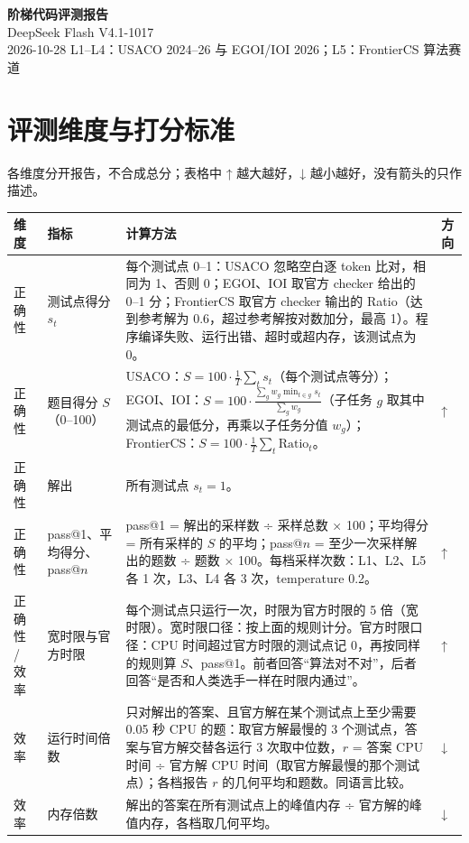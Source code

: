 \documentclass[11pt,a4paper,fontset=none]{ctexart}
\begin{document}
\begin{center}
{\LARGE\bfseries 阶梯代码评测报告}\\[0.5em]
{\Large DeepSeek Flash V4.1-1017}\\[0.4em]
{\small 2026-10-28 \quad L1--L4：USACO 2024--26 与 EGOI/IOI 2026；L5：FrontierCS 算法赛道}
\end{center}
\section{评测维度与打分标准}
各维度分开报告，不合成总分；表格中 ↑ 越大越好，↓ 越小越好，没有箭头的只作描述。
{\small\begin{longtable}{@{}p{1.6cm}p{2.6cm}p{9.9cm}p{1.2cm}@{}}
\toprule 维度 & 指标 & 计算方法 & 方向 \\ \midrule \endhead
正确性 & 测试点得分 $s_t$ & 每个测试点 0–1：USACO 忽略空白逐 token 比对，相同为 1、否则 0；EGOI、IOI 取官方 checker 给出的 0–1 分；FrontierCS 取官方 checker 输出的 Ratio（达到参考解为 0.6，超过参考解按对数加分，最高 1）。程序编译失败、运行出错、超时或超内存，该测试点为 0。 &  \\
正确性 & 题目得分 $S$（0–100） & USACO：$S = 100 \cdot \frac{1}{T}\sum_t s_t$（每个测试点等分）；EGOI、IOI：$S = 100 \cdot \frac{\sum_g w_g \min_{t \in g} s_t}{\sum_g w_g}$（子任务 $g$ 取其中测试点的最低分，再乘以子任务分值 $w_g$）；FrontierCS：$S = 100 \cdot \frac{1}{T}\sum_t \mathrm{Ratio}_t$。 & ↑ \\
正确性 & 解出 & 所有测试点 $s_t = 1$。 &  \\
正确性 & pass@1、平均得分、pass@$n$ & pass@1 = 解出的采样数 ÷ 采样总数 × 100；平均得分 = 所有采样的 $S$ 的平均；pass@$n$ = 至少一次采样解出的题数 ÷ 题数 × 100。每档采样次数：L1、L2、L5 各 1 次，L3、L4 各 3 次，temperature 0.2。 & ↑ \\
正确性 / 效率 & 宽时限与官方时限 & 每个测试点只运行一次，时限为官方时限的 5 倍（宽时限）。宽时限口径：按上面的规则计分。官方时限口径：CPU 时间超过官方时限的测试点记 0，再按同样的规则算 $S$、pass@1。前者回答“算法对不对”，后者回答“是否和人类选手一样在时限内通过”。 & ↑ \\
效率 & 运行时间倍数 & 只对解出的答案、且官方解在某个测试点上至少需要 0.05 秒 CPU 的题：取官方解最慢的 3 个测试点，答案与官方解交替各运行 3 次取中位数，$r$ = 答案 CPU 时间 ÷ 官方解 CPU 时间（取官方解最慢的那个测试点）；各档报告 $r$ 的几何平均和题数。同语言比较。 & ↓ \\
效率 & 内存倍数 & 解出的答案在所有测试点上的峰值内存 ÷ 官方解的峰值内存，各档取几何平均。 & ↓ \\

\end{longtable}}
\end{document}

